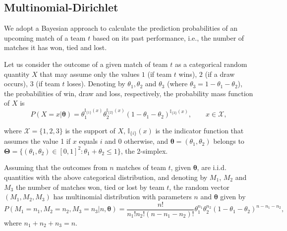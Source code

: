 \documentclass[journal,article,accept,moreauthors,pdftex,12pt,a4paper]{mdpi}
\begin{document}
    \subsection{Multinomial-Dirichlet}
    \label{sec::Mn_Dir}

        We adopt a Bayesian approach to calculate the prediction probabilities of an upcoming match of a team $t$ based on its past performance, i.e., the number of matches it has won, tied and lost.

        Let us consider the outcome of a given match of team $t$ as a categorical random quantity $X$ that may assume only the values $1$ (if team $t$ wins), $2$ (if a draw occurs), $3$ (if team $t$ loses).
        Denoting by $\theta_1, \theta_2$ and $\theta_3$ (where $\theta_3 = 1-\theta_1 - \theta_2$), the probabilities of win, draw and loss, respectively, the probability mass function of $X$ is
        \[
        P(X=x | \boldsymbol{\theta}) = \theta_1^{\mathbb{I}_{\{1\}}(x)}
        \theta_2^{\mathbb{I}_{\{2\}}(x)}(1 - \theta_1 -
        \theta_2)^{{\mathbb{I}_{\{3\}}}(x)}, \qquad x \in \mathcal{X},
        \]

        \noindent
        where $\mathcal{X}=\{1,2,3\}$ is the support of $X$,
        $\mathbb{I}_{\{i\}}(x)$ is the indicator function that assumes the
        value 1 if $x$ equals $i$ and 0 otherwise, and $\boldsymbol{\theta}
        = (\theta_1, \theta_2)$ belongs to $\boldsymbol{\Theta} =
        \{(\theta_1,\theta_2)\in [0,1]^2: \theta_1+\theta_2 \leq 1 \}$, the 2-simplex.

        Assuming that the outcomes from $n$ matches of team $t$, given $\boldsymbol{\theta}$, are i.i.d. quantities with the above categorical distribution, and denoting by $M_1$, $M_2$ and $M_3$ the number of matches won, tied or lost by team $t$, the random vector $(M_1, M_2, M_3)$ has multinomial distribution with parameters $n$ and $\boldsymbol{\theta}$ given by
        \[
        P(M_1=n_1,M_2=n_2,M_3=n_3| n, \boldsymbol{\theta})=
        \frac{n!}{n_1!n_2!(n-n_1-n_2)!}\theta_1^{n_1}\theta_2^{n_2}(1-\theta_1-\theta_2)^{n-n_1-n_2},
        \]
        \noindent
        where $n_1 + n_2 + n_3 = n$.
\end{document}
